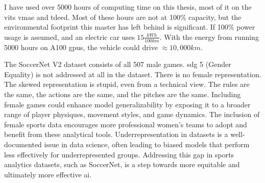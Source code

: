 I have used over 5000 hours of computing time on this thesis, most of it on the \acrlong{vit}s \acrshort{vmae} and \acrshort{tdeed}. Most of these hours are not at 100$\%$ capacity, but the environmental footprint this master has left behind is significant. If 100$\%$ power usage is assumed, and an electric car uses $15\frac{kWh}{100km}$. With the energy from running 5000 hours on A100 \acrshort{gpu}s, the vehicle could drive $\approx10,000 km$. 

The SoccerNet V2 dataset consists of all 507 male games. \acrshort{sdg} 5 (Gender Equality) is not addressed at all in the dataset. There is no female representation. The skewed representation is stupid, even from a technical view. The rules are the same, the actions are the same, and the pitches are the same. Including female games could enhance model generalizability by exposing it to a broader range of player physiques, movement styles, and game dynamics. The inclusion of female sports data encourages more professional women's teams to adopt and benefit from these analytical tools. Underrepresentation in datasets is a well-documented issue in data science, often leading to biased models that perform less effectively for underrepresented groups. Addressing this gap in sports analytics datasets, such as SoccerNet, is a step towards more equitable and ultimately more effective \acrshort{ai}.